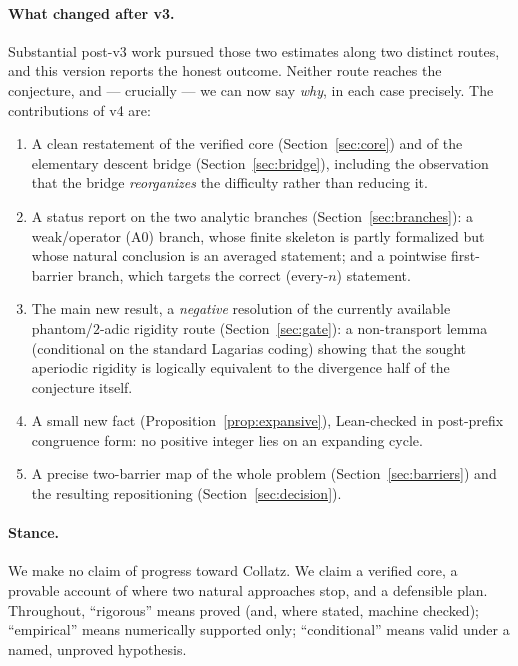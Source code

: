 \documentclass[11pt,a4paper]{article}
\theoremstyle{definition}
\begin{document}
\paragraph{What changed after v3.}
Substantial post-v3 work pursued those two estimates along two distinct
routes, and this version reports the honest outcome. Neither route reaches
the conjecture, and --- crucially --- we can now say \emph{why}, in each
case precisely. The contributions of v4 are:
\begin{enumerate}[leftmargin=2em]
  \item A clean restatement of the verified core
        (Section~\ref{sec:core}) and of the elementary descent bridge
        (Section~\ref{sec:bridge}), including the observation that the
        bridge \emph{reorganizes} the difficulty rather than reducing it.
  \item A status report on the two analytic branches
        (Section~\ref{sec:branches}): a weak/operator (A0) branch, whose
        finite skeleton is partly formalized but whose natural conclusion
        is an averaged statement; and a pointwise first-barrier branch,
        which targets the correct (every-$n$) statement.
  \item The main new result, a \emph{negative} resolution of the
        currently available phantom/$2$-adic rigidity route
        (Section~\ref{sec:gate}): a non-transport lemma (conditional on
        the standard Lagarias coding) showing that the sought aperiodic
        rigidity is logically equivalent to the divergence half of the
        conjecture itself.
  \item A small new fact (Proposition~\ref{prop:expansive}), Lean-checked
        in post-prefix congruence form: no positive integer lies on an
        expanding cycle.
  \item A precise two-barrier map of the whole problem
        (Section~\ref{sec:barriers}) and the resulting repositioning
        (Section~\ref{sec:decision}).
\end{enumerate}

\paragraph{Stance.}
We make no claim of progress toward Collatz. We claim a verified core, a
provable account of where two natural approaches stop, and a defensible
plan. Throughout, ``rigorous'' means proved (and, where stated, machine
checked); ``empirical'' means numerically supported only; ``conditional''
means valid under a named, unproved hypothesis.
\end{document}
